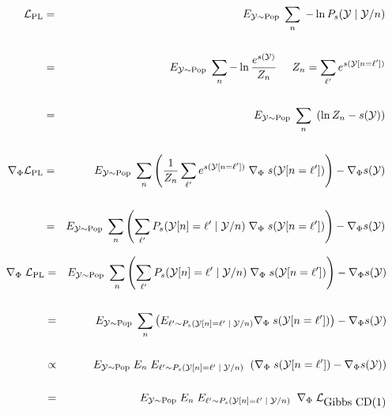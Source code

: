 {\huge
\begin{eqnarray*}
{\cal L}_{\mathrm{PL}} & = & E_{{\cal Y} \sim \mathrm{Pop}}\;\sum_n \; - \ln P_s({\cal Y}\;|\;{\cal Y}/n) \\
\\
 & = & E_{{\cal Y} \sim \mathrm{Pop}}\;\sum_n -\ln \frac{e^{s({\cal Y})}}{Z_n}\;\;\;\;\;{Z_n = \sum_{\ell'} e^{s({\cal Y}[n=\ell'])}} \\
\\
& = & E_{{\cal Y} \sim \mathrm{Pop}}\;\sum_n\; \left(\ln Z_n - s({\cal Y})\right) \\
\\
\nabla_\Phi {\cal L}_{\mathrm{PL}} & = & E_{{\cal Y} \sim \mathrm{Pop}}\;\sum_n \left(\frac{1}{Z_n} \sum_{\ell'} e^{s({\cal Y}[n=\ell'])} \; \nabla_\Phi\;s({\cal Y}[n=\ell'])\right) - \nabla_\Phi s({\cal Y}) \\
\\
& = & E_{{\cal Y} \sim \mathrm{Pop}}\;\sum_n \left(\sum_{\ell'} P_s({\cal Y}[n]=\ell'\;|\;{\cal Y}/n) \; \nabla_\Phi\;s({\cal Y}[n=\ell'])\right) - \nabla_\Phi s({\cal Y})
\end{eqnarray*}
}


{\huge
\begin{eqnarray*}
\nabla_\Phi\;{\cal L}_{\mathrm{PL}} & = & E_{{\cal Y} \sim \mathrm{Pop}}\;\sum_n \left(\sum_{\ell'} P_s({\cal Y}[n]=\ell'\;|\;{\cal Y}/n)\; \nabla_\Phi\;s({\cal Y}[n=\ell'])\right) - \nabla_\Phi s({\cal Y}) \\
\\
& = & E_{{\cal Y} \sim \mathrm{Pop}}\;\sum_n \left(E_{\ell' \sim P_s({\cal Y}[n]=\ell'\;|\;{\cal Y}/n)} \nabla_\Phi\;s({\cal Y}[n=\ell'])\right) - \nabla_\Phi s({\cal Y}) \\
\\
& \propto & E_{{\cal Y} \sim \mathrm{Pop}}\;E_n\;  E_{\ell' \sim P_s({\cal Y}[n]=\ell'\;|\;{\cal Y}/n)}\;\; (\nabla_\Phi\;s({\cal Y}[n=\ell']) - \nabla_\Phi s({\cal Y})) \\
\\
& = & E_{{\cal Y} \sim \mathrm{Pop}}\;E_n\; E_{\ell' \sim P_s({\cal Y}[n]=\ell'\;|\;{\cal Y}/n)}\;\; \nabla_\Phi\;{\cal L}_{\mbox{Gibbs CD(1)}}
\end{eqnarray*}
}
